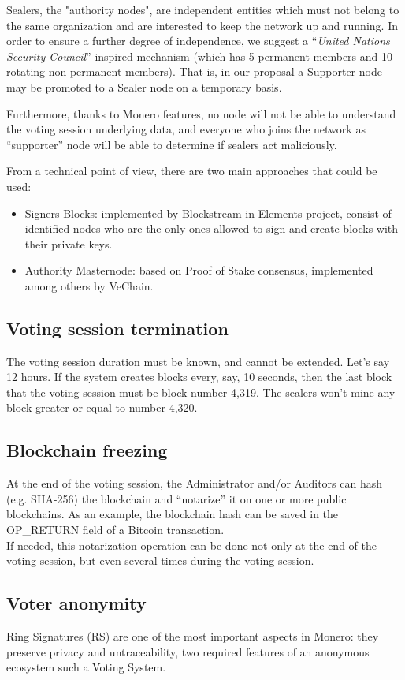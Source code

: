 \documentclass[10pt, letterpaper]{article}
\begin{document}
Sealers, the "authority nodes", are independent entities which must not belong to the same organization and are interested to keep the network up and running. In order to ensure a further degree of independence, we suggest a “\textit{United Nations Security Council}”-inspired mechanism (which has 5 permanent members and 10 rotating non-permanent members). That is, in our proposal a Supporter node may be promoted to a Sealer node on a temporary basis.
\bigskip

Furthermore, thanks to Monero features, no node will not be able to understand the voting session underlying data, and everyone who joins the network as “supporter” node will be able to determine if sealers act maliciously.
\bigskip

From a technical point of view, there are two main approaches that could be used:
\begin{itemize}
\item Signers Blocks: implemented by Blockstream in Elements project, consist of identified nodes who are the only ones allowed to sign and create blocks with their private keys.
\item Authority Masternode: based on Proof of Stake consensus, implemented among others by VeChain.
\end{itemize}

\subsection{Voting session termination}
The voting session duration must be known, and cannot be extended. Let’s say 12 hours.
If the system creates blocks every, say, 10 seconds, then the last block that the voting session must be block number 4,319. The sealers won’t mine any block greater or equal to number 4,320.

\subsection{Blockchain freezing}
At the end of the voting session, the Administrator and/or Auditors can hash (e.g. SHA-256) the blockchain and “notarize” it on one or more public blockchains. As an example, the blockchain hash can be saved in the OP\_RETURN field of a Bitcoin transaction.\\
If needed, this notarization operation can be done not only at the end of the voting session, but even several times during the voting session.
\subsection{Voter anonymity}
Ring Signatures (RS) are one of the most important aspects in Monero: they preserve privacy and untraceability, two required features of an anonymous ecosystem such a Voting System. 
\bigskip
\end{document}
